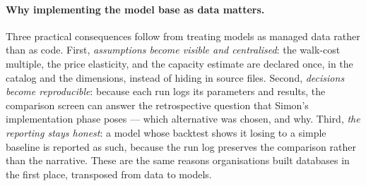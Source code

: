\paragraph{Why implementing the model base as data matters.}
Three practical consequences follow from treating models as managed data rather than as code. First, \emph{assumptions become visible and centralised}: the walk-cost multiple, the price elasticity, and the capacity estimate are declared once, in the catalog and the dimensions, instead of hiding in source files. Second, \emph{decisions become reproducible}: because each run logs its parameters and results, the comparison screen can answer the retrospective question that Simon's implementation phase poses --- which alternative was chosen, and why. Third, \emph{the reporting stays honest}: a model whose backtest shows it losing to a simple baseline is reported as such, because the run log preserves the comparison rather than the narrative. These are the same reasons organisations built databases in the first place, transposed from data to models.
